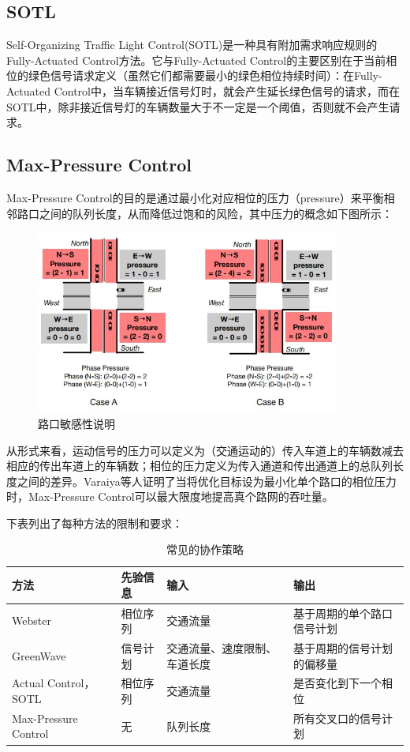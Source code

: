 \subsection{SOTL}
Self-Organizing Traffic Light Control(SOTL)是一种具有附加需求响应规则的Fully-Actuated Control方法。它与Fully-Actuated Control的主要区别在于当前相位的绿色信号请求定义（虽然它们都需要最小的绿色相位持续时间）：在Fully-Actuated Control中，当车辆接近信号灯时，就会产生延长绿色信号的请求，而在SOTL中，除非接近信号灯的车辆数量大于不一定是一个阈值，否则就不会产生请求。

\subsection{Max-Pressure Control}
Max-Pressure Control的目的是通过最小化对应相位的压力（pressure）来平衡相邻路口之间的队列长度，从而降低过饱和的风险，其中压力的概念如下图所示：
\begin{figure}[htb]
    \includegraphics[width=10cm]{fig/max-pressure.jpg}
    \caption{路口敏感性说明}
    \label{fig:max-pressure}
\end{figure}
从形式来看，运动信号的压力可以定义为（交通运动的）传入车道上的车辆数减去相应的传出车道上的车辆数；相位的压力定义为传入通道和传出通道上的总队列长度之间的差异。Varaiya等人证明了当将优化目标设为最小化单个路口的相位压力时，Max-Pressure Control可以最大限度地提高真个路网的吞吐量。

下表列出了每种方法的限制和要求：
\begin{table}[htb]
    \caption[协作策略]{常见的协作策略\label{tab:coordination}}
    \begin{tabular}{llll}
      \toprule
      方法 & 先验信息 & 输入 & 输出 \\
      \midrule
      Webster & 相位序列 & 交通流量 & 基于周期的单个路口信号计划 \\
      GreenWave & 信号计划 & 交通流量、速度限制、车道长度 & 基于周期的信号计划的偏移量 \\
      Actual Control， SOTL & 相位序列& 交通流量 & 是否变化到下一个相位\\
      Max-Pressure Control & 无 & 队列长度 & 所有交叉口的信号计划\\
      \bottomrule
    \end{tabular}
\end{table}

